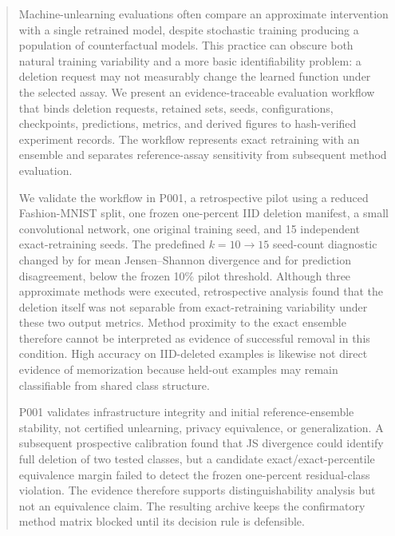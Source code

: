 \begin{abstract}
Machine-unlearning evaluations often compare an approximate intervention with a single
retrained model, despite stochastic training producing a population of counterfactual
models. This practice can obscure both natural training variability and a more basic
identifiability problem: a deletion request may not measurably change the learned function
under the selected assay. We present an evidence-traceable evaluation workflow that binds
deletion requests, retained sets, seeds, configurations, checkpoints, predictions, metrics,
and derived figures to hash-verified experiment records. The workflow represents exact
retraining with an ensemble and separates reference-assay sensitivity from subsequent
method evaluation.

We validate the workflow in P001, a retrospective pilot using a reduced Fashion-MNIST
split, one frozen one-percent IID deletion manifest, a small convolutional network, one
original training seed, and 15 independent exact-retraining seeds. The predefined
$k=10\rightarrow15$ seed-count diagnostic changed by \PilotJSConvergence{} for mean
Jensen--Shannon divergence and \PilotDisagreementConvergence{} for prediction
disagreement, below the frozen 10\% pilot threshold. Although three approximate methods
were executed, retrospective analysis found that the deletion itself was not separable
from exact-retraining variability under these two output metrics. Method proximity to the
exact ensemble therefore cannot be interpreted as evidence of successful removal in this
condition. High accuracy on IID-deleted examples is likewise not direct evidence of
memorization because held-out examples may remain classifiable from shared class structure.

P001 validates infrastructure integrity and initial reference-ensemble stability, not
certified unlearning, privacy equivalence, or generalization. A subsequent prospective
calibration found that JS divergence could identify full deletion of two tested classes,
but a candidate exact/exact-percentile equivalence margin failed to detect the frozen
one-percent residual-class violation. The evidence therefore supports distinguishability
analysis but not an equivalence claim. The resulting archive keeps the confirmatory method
matrix blocked until its decision rule is defensible.
\end{abstract}
